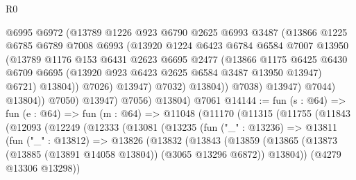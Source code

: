 \begin{lexlean}{R0}
\begin{coremodule}
                            @6995
                            @6972
                            (@13789
                              @1226
                              @923
                              @6790
                              @2625
                              @6993
                              @3487
                              (@13866
                                @1225
                                @6785
                                @6789
                                @7008
                                @6993
                                (@13920
                                  @1224
                                  @6423
                                  @6784
                                  @6584
                                  @7007
                                  @13950
                                  (@13789
                                    @1176
                                    @153
                                    @6431
                                    @2623
                                    @6695
                                    @2477
                                    (@13866
                                      @1175
                                      @6425
                                      @6430
                                      @6709
                                      @6695
                                      (@13920 @923 @6423 @2625 @6584 @3487 @13950 @13947)
                                      @6721)
                                    @13804))
                                @7026)
                              @13947)
                            @7032)
                          @13804))
                      @7038)
                    @13947)
                  @7044)
                @13804))
            @7050)
          @13947)
        @7056)
      @13804)
    @7061
@14144 := fun (s : @64) =>
  fun (e : @64) =>
  fun (m : @64) =>
  @11048
    (@11170
      (@11315
        (@11755
          (@11843
            (@12093
              (@12249
                (@12333
                  (@13081
                    (@13235
                      (fun ("_" : @13236) =>
                      @13811
                        (fun ("_" : @13812) =>
                        @13826
                          (@13832
                            (@13843
                              (@13859
                                (@13865
                                  (@13873 (@13885 (@13891 @14058 @13804)) (@3065 @13296 @6872))
                                  @13804))
                              (@4279 @13306 @13298))

\end{coremodule}
\end{lexlean}
